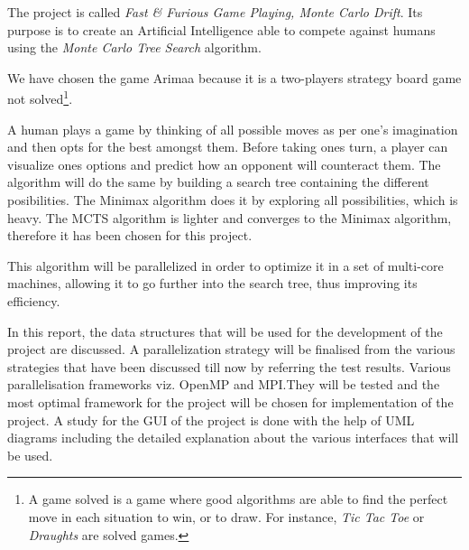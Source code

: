 The project is called \emph{Fast \& Furious Game Playing, Monte Carlo Drift}. Its purpose is to create an Artificial Intelligence able to compete against humans using the \emph{Monte Carlo Tree Search} algorithm.

We have chosen the game Arimaa because it is a two-players strategy board game not solved\footnote{A game solved is a game where good algorithms are able to find the perfect move in each situation to win, or to draw. For instance, \textit{Tic Tac Toe} or \textit{Draughts} are solved games.}.

A human plays a game by thinking of all possible moves as per one's imagination and then opts for the best amongst them. Before taking ones turn, a player can visualize ones options and predict how an opponent will counteract them. The algorithm will do the same by building a search tree containing the different posibilities. The Minimax algorithm does it by exploring all possibilities, which is heavy. The MCTS algorithm is lighter and converges to the Minimax algorithm, therefore it has been chosen for this project.

This algorithm will be parallelized in order to optimize it in a set of multi-core machines, allowing it to go further into the search tree, thus improving its efficiency.

In this report, the data structures that will be used for the development of the project are discussed.
A parallelization strategy will be finalised from the various strategies that have been discussed till now by referring the test results. Various parallelisation frameworks viz. OpenMP and MPI.They will be tested and the most optimal framework for the project will be chosen for implementation of the project.
A study for the GUI of the project is done with the help of UML diagrams including the detailed explanation about the various interfaces that will be used.